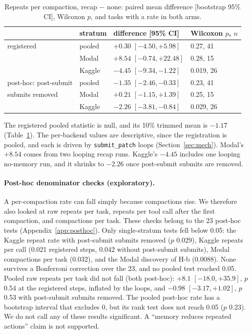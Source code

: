 \documentclass[11pt]{article}
\newcommand{\code}[1]{\texttt{#1}}
\begin{document}
\begin{table}[t]\centering\small
\caption{Repeats per compaction, recap $-$ none: paired mean difference [bootstrap 95\% CI],
Wilcoxon $p$, and tasks with a rate in both arms.}\label{tab:rep}
\begin{tabular}{llll}\toprule
 & stratum & difference [95\% CI] & Wilcoxon $p$, $n$ \\\midrule
registered & pooled & $+0.30$ $[-4.50, +5.98]$ & 0.27, 41 \\
 & Modal & $+8.54$ $[-0.74, +22.48]$ & 0.28, 15 \\
 & Kaggle & $-4.45$ $[-9.34, -1.22]$ & 0.019, 26 \\\midrule
post-hoc: post-submit & pooled & $-1.35$ $[-2.46, -0.33]$ & 0.23, 41 \\
\quad submits removed & Modal & $+0.21$ $[-1.15, +1.39]$ & 0.25, 15 \\
 & Kaggle & $-2.26$ $[-3.81, -0.84]$ & 0.029, 26 \\\bottomrule
\end{tabular}
\end{table}

The registered pooled statistic is null, and its 10\% trimmed mean is $-1.17$ (Table~\ref{tab:rep}).
The per-backend values are descriptive, since the registration is pooled, and each is driven by
\code{submit\_patch} loops (Section~\ref{sec:mech}). Modal's $+8.54$ comes from two looping recap
runs. Kaggle's $-4.45$ includes one looping no-memory run, and it shrinks to $-2.26$ once
post-submit submits are removed.

\paragraph{Post-hoc denominator checks (exploratory).} A per-compaction rate can fall simply because
compactions rise. We therefore also looked at raw repeats per task, repeats per tool call after the
first compaction, and compactions per task. These checks belong to the 23 post-hoc tests
(Appendix~\ref{app:posthoc}). Only single-stratum tests fell below 0.05: the Kaggle repeat rate with
post-submit submits removed ($p$ 0.029), Kaggle repeats per call (0.021 registered steps, 0.042
without post-submit submits), Modal compactions per task (0.032), and the Modal discovery of H-b
(0.0088). None survives a Bonferroni correction over the 23, and no pooled test reached 0.05.
Pooled raw repeats per task did not fall (both post-hoc): $+8.1$ $[-18.0, +35.9]$, $p$ 0.54 at the registered steps, inflated by the loops, and $-0.98$ $[-3.17, +1.02]$, $p$ 0.53 with post-submit submits removed. The pooled post-hoc
rate has a bootstrap interval that excludes 0, but its rank test does not reach 0.05 ($p$ 0.23).
We do not call any of these results significant. A ``memory reduces repeated actions'' claim is not
supported.
\end{document}
